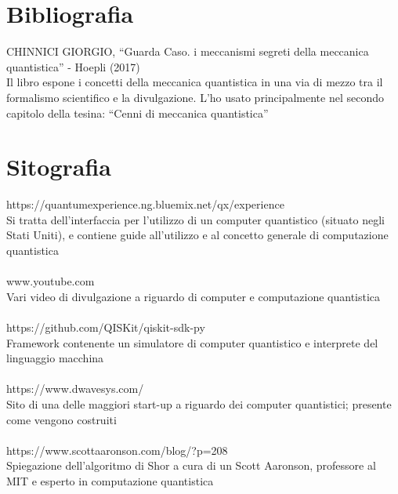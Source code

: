 \section{Bibliografia}
CHINNICI GIORGIO, “Guarda Caso. i meccanismi segreti della meccanica quantistica” - Hoepli (2017)\\
Il libro espone i concetti della meccanica quantistica in una via di mezzo tra il formalismo scientifico e la divulgazione. L’ho usato principalmente nel secondo capitolo della tesina: “Cenni di meccanica quantistica”\\
\section{Sitografia}
https://quantumexperience.ng.bluemix.net/qx/experience\\
Si tratta dell’interfaccia per l’utilizzo di un computer quantistico (situato negli Stati Uniti), e contiene guide all’utilizzo e al concetto generale di computazione quantistica\\
\\
www.youtube.com\\
Vari video di divulgazione a riguardo di computer e computazione quantistica\\
\\
https://github.com/QISKit/qiskit-sdk-py\\
Framework contenente un simulatore di computer quantistico e interprete del linguaggio macchina\\
\\
https://www.dwavesys.com/\\
Sito di una delle maggiori start-up a riguardo dei computer quantistici; presente come vengono costruiti\\
\\
https://www.scottaaronson.com/blog/?p=208\\
Spiegazione dell’algoritmo di Shor a cura di un Scott Aaronson, professore al MIT e  esperto in computazione quantistica